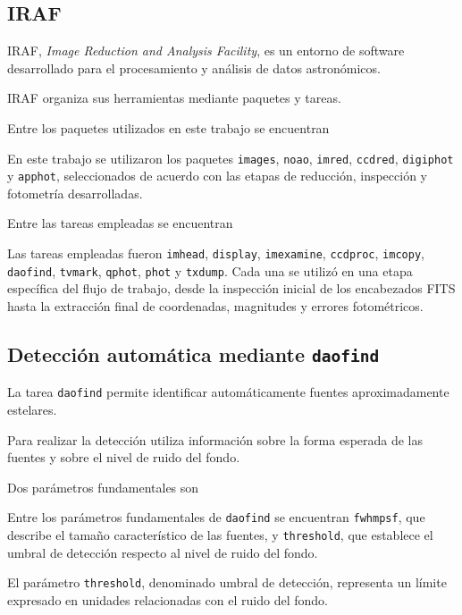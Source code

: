 \documentclass[12pt,letterpaper,oneside]{book}
\begin{document}
\subsection{IRAF}

IRAF, \textit{Image Reduction and Analysis Facility}, es un entorno de software desarrollado para el procesamiento y análisis de datos astronómicos.

IRAF organiza sus herramientas mediante paquetes y tareas.

Entre los paquetes utilizados en este trabajo se encuentran

En este trabajo se utilizaron los paquetes \texttt{images}, \texttt{noao}, \texttt{imred}, \texttt{ccdred}, \texttt{digiphot} y \texttt{apphot}, seleccionados de acuerdo con las etapas de reducción, inspección y fotometría desarrolladas.

Entre las tareas empleadas se encuentran

Las tareas empleadas fueron \texttt{imhead}, \texttt{display}, \texttt{imexamine}, \texttt{ccdproc}, \texttt{imcopy}, \texttt{daofind}, \texttt{tvmark}, \texttt{qphot}, \texttt{phot} y \texttt{txdump}. Cada una se utilizó en una etapa específica del flujo de trabajo, desde la inspección inicial de los encabezados FITS hasta la extracción final de coordenadas, magnitudes y errores fotométricos.



\subsection{Detección automática mediante \texttt{daofind}}

La tarea \texttt{daofind} permite identificar automáticamente fuentes aproximadamente estelares.

Para realizar la detección utiliza información sobre la forma esperada de las fuentes y sobre el nivel de ruido del fondo.

Dos parámetros fundamentales son

Entre los parámetros fundamentales de \texttt{daofind} se encuentran \texttt{fwhmpsf}, que describe el tamaño característico de las fuentes, y \texttt{threshold}, que establece el umbral de detección respecto al nivel de ruido del fondo.

El parámetro \texttt{threshold}, denominado umbral de detección, representa un límite expresado en unidades relacionadas con el ruido del fondo.
\end{document}
